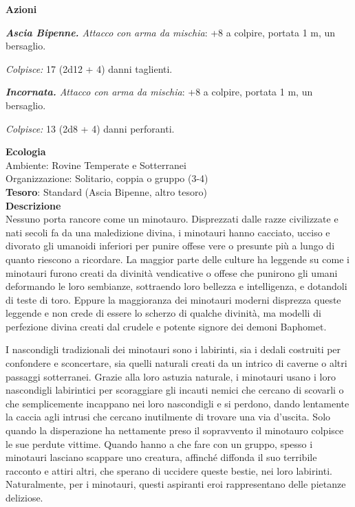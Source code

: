 \begin{multicols}{2}
\textbf{Azioni}

\textit{\textbf{Ascia Bipenne.} Attacco con arma da mischia}: +8 a colpire, portata 1 m, un bersaglio.

\textit{Colpisce:} 17 (2d12 + 4) danni taglienti.

\textit{\textbf{Incornata.} Attacco con arma da mischia}: +8 a colpire, portata 1 m, un bersaglio.

\textit{Colpisce:} 13 (2d8 + 4) danni perforanti.

\textbf{Ecologia}\\
Ambiente: Rovine Temperate e Sotterranei\\
Organizzazione: Solitario, coppia o gruppo (3-4)\\
\textbf{Tesoro}: Standard (Ascia Bipenne, altro tesoro)\\
\textbf{Descrizione}\\
Nessuno porta rancore come un minotauro. Disprezzati dalle razze civilizzate e nati secoli fa da una maledizione divina, i minotauri hanno cacciato, ucciso e divorato gli umanoidi inferiori per punire offese vere o presunte più a lungo di quanto riescono a ricordare. La maggior parte delle culture ha leggende su come i minotauri furono creati da divinità vendicative o offese che punirono gli umani deformando le loro sembianze, sottraendo loro bellezza e intelligenza, e dotandoli di teste di toro. Eppure la maggioranza dei minotauri moderni disprezza queste leggende e non crede di essere lo scherzo di qualche divinità, ma modelli di perfezione divina creati dal crudele e potente signore dei demoni Baphomet.

I nascondigli tradizionali dei minotauri sono i labirinti, sia i dedali costruiti per confondere e sconcertare, sia quelli naturali creati da un intrico di caverne o altri passaggi sotterranei. Grazie alla loro astuzia naturale, i minotauri usano i loro nascondigli labirintici per scoraggiare gli incauti nemici che cercano di scovarli o che semplicemente incappano nei loro nascondigli e si perdono, dando lentamente la caccia agli intrusi che cercano inutilmente di trovare una via d'uscita. Solo quando la disperazione ha nettamente preso il sopravvento il minotauro colpisce le sue perdute vittime. Quando hanno a che fare con un gruppo, spesso i minotauri lasciano scappare uno creatura, affinché diffonda il suo terribile racconto e attiri altri, che sperano di uccidere queste bestie, nei loro labirinti. Naturalmente, per i minotauri, questi aspiranti eroi rappresentano delle pietanze deliziose.


\end{multicols}
